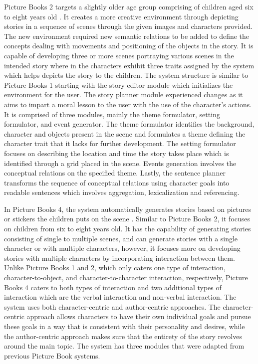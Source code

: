 Picture Books 2 targets a slightly older age group comprising of children aged six to eight years old \cite{ang2010generating}. It creates a more creative environment through depicting stories in a sequence of scenes through the given images and characters provided. The new environment required new semantic relations to be added to define the concepts dealing with movements and positioning of the objects in the story. It is capable of developing three or more scenes portraying various scenes in the intended story where in the characters exhibit three traits assigned by the system which helps depicts the story to the children. The system structure is similar to Picture Books 1 starting with the story editor module which initializes the environment for the user. The story planner module experienced changes as it aims to impart a moral lesson to the user with the use of the character's actions. It is comprised of three modules, mainly the theme formulator, setting formulator, and event generator. The theme formulator identifies the background, character and objects present in the scene and formulates a theme defining the character trait that it lacks for further development. The setting formulator focuses on describing the location and time the story takes place which is identified through a grid placed in the scene. Events generation involves the conceptual relations on the specified theme. Lastly, the sentence planner transforms the sequence of conceptual relations using character goals into readable sentences which involves aggregation, lexicalization and referencing.

In Picture Books 4, the system automatically generates stories based on pictures or stickers the children puts on the scene \cite{picbooks4}. Similar to Picture Books 2, it focuses on children from six to eight years old. It has the capability of generating stories consisting of single to multiple scenes, and can generate stories with a single character or with multiple characters, however, it focuses more on developing stories with multiple characters by incorporating interaction between them. Unlike Picture Books 1 and 2, which only caters one type of interaction, character-to-object, and character-to-character interaction, respectively, Picture Books 4 caters to both types of interaction and two additional types of interaction which are the verbal interaction and non-verbal interaction. The system uses both character-centric and author-centric approaches. The character-centric approach allows characters to have their own individual goals and pursue these goals in a way that is consistent with their personality and desires, while the author-centric approach makes sure that the entirety of the story revolves around the main topic. The system has three modules that were adapted from previous Picture Book systems. 

